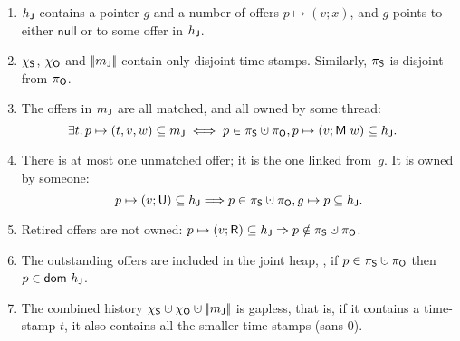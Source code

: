 \begin{enumerate}[label=(\roman*)]
\item\label{exP} $h_{\mathsf{J}}$ contains a pointer $g$ and a number of
  offers $p \mapsto (v; x)$, and $g$ points to either $\mathsf{null}$
  or to some offer in $h_{\mathsf{J}}$.

\item $\chi_{\mathsf{S}}$, $\chi_{\mathsf{O}}$ and $|\!|{{m_{\mathsf{J}}}}|\!|$ contain only
  disjoint time-stamps. Similarly, $\pi_{\mathsf{S}}$ is disjoint from $\pi_{\mathsf{O}}$.

\item\label{matched} The offers in ${m_{\mathsf{J}}}$ are all matched, and all
  owned by some thread:
\[
\!\!\!\!\!\!
{\small{
\exists t\ldot p \mapsto (t, v, w) \subseteq \pending \iff p \in
\perms \hunion \permo, p \mapsto (v; \Matched w) \subseteq \heapj.
}}
\]
\item There is at most one unmatched offer; it is the one linked
  from~$g$. It is owned by someone:
\[
{\small{
p \mapsto (v; \Unmatched) \subseteq \heapj \Longrightarrow p \in \perms \hunion
\permo, g \mapsto p \subseteq \heapj.
}}
\]
\item Retired offers are not owned: $p \mapsto (v; \Retired)
  \subseteq \heapj \Rightarrow p \notin \perms \hunion \permo$.

\item The outstanding offers are included in the joint heap, \ie, if
  $p \in \perms \hunion \permo$ then $p \in \mathsf{dom}\ h_{\mathsf{J}}$.

\item\label{ex:gapless} The combined history $\hists \hunion \histo \hunion
  \mygather{\pending}$ is gapless, that is, if it contains a
  time-stamp $t$, it also contains all the smaller time-stamps (sans
  0).

\end{enumerate}


